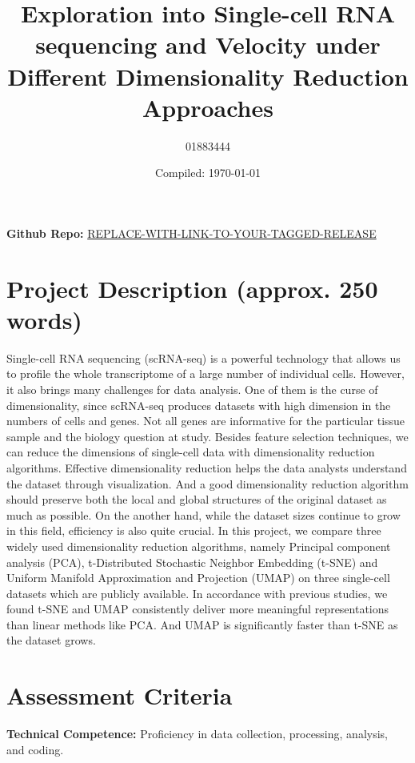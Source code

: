 \documentclass[a4paper, 12pt]{article}
\title{Exploration into Single-cell RNA sequencing and Velocity under Different Dimensionality Reduction Approaches}
\author{01883444}
\date{Compiled: \today}
\begin{document}
\maketitle

\textbf{Github Repo:} \href{https://github.com/zakvarty/eds-notes-quarto/releases/tag/v1.2.0-alpha}{REPLACE-WITH-LINK-TO-YOUR-TAGGED-RELEASE}

\section{Project Description (approx. 250 words)}

Single-cell RNA sequencing (scRNA-seq) is a powerful technology that allows us to profile the whole transcriptome of a large number of individual cells. 
However, it also brings many challenges for data analysis.
One of them is the curse of dimensionality, since scRNA-seq produces datasets with high dimension in the numbers of cells and genes. 
Not all genes are informative for the particular tissue sample and the biology question at study.
Besides feature selection techniques, we can reduce the dimensions of single-cell data with dimensionality reduction algorithms.
Effective dimensionality reduction helps the data analysts understand the dataset through visualization.
And a good dimensionality reduction algorithm should preserve both the local and global structures of the original dataset as much as possible. 
On the another hand, while the dataset sizes continue to grow in this field, efficiency is also quite crucial.
In this project, we compare three widely used dimensionality reduction algorithms, namely Principal component analysis (PCA), t-Distributed Stochastic Neighbor Embedding (t-SNE) and Uniform Manifold Approximation and Projection (UMAP) on three single-cell datasets which are publicly available.
In accordance with previous studies, we found t-SNE and UMAP consistently deliver more meaningful representations than linear methods like PCA. 
And UMAP is significantly faster than t-SNE as the dataset grows.






\pagebreak

\section{Assessment Criteria}

\textbf{Technical Competence:} Proficiency in data collection, processing, analysis, and coding.
\end{document}
